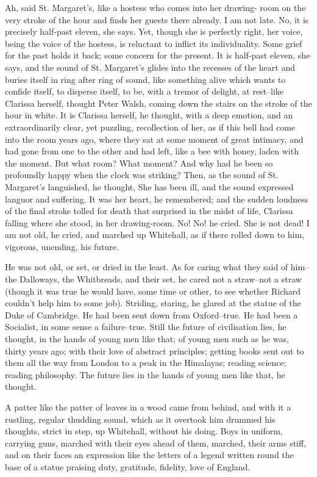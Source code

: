 \documentclass[lang=cn,10pt]{elegantbook}
\begin{document}
Ah, said St. Margaret's, like a hostess who comes into her drawing-
room on the very stroke of the hour and finds her guests there
already.  I am not late.  No, it is precisely half-past eleven, she
says.  Yet, though she is perfectly right, her voice, being the
voice of the hostess, is reluctant to inflict its individuality.
Some grief for the past holds it back; some concern for the
present.  It is half-past eleven, she says, and the sound of St.
Margaret's glides into the recesses of the heart and buries itself
in ring after ring of sound, like something alive which wants to
confide itself, to disperse itself, to be, with a tremor of
delight, at rest--like Clarissa herself, thought Peter Walsh,
coming down the stairs on the stroke of the hour in white.  It is
Clarissa herself, he thought, with a deep emotion, and an
extraordinarily clear, yet puzzling, recollection of her, as if
this bell had come into the room years ago, where they sat at some
moment of great intimacy, and had gone from one to the other and
had left, like a bee with honey, laden with the moment.  But what
room?  What moment?  And why had he been so profoundly happy when
the clock was striking?  Then, as the sound of St. Margaret's
languished, he thought, She has been ill, and the sound expressed
languor and suffering.  It was her heart, he remembered; and the
sudden loudness of the final stroke tolled for death that surprised
in the midst of life, Clarissa falling where she stood, in her
drawing-room.  No!  No! he cried.  She is not dead!  I am not old,
he cried, and marched up Whitehall, as if there rolled down to him,
vigorous, unending, his future.

He was not old, or set, or dried in the least.  As for caring what
they said of him--the Dalloways, the Whitbreads, and their set, he
cared not a straw--not a straw (though it was true he would have,
some time or other, to see whether Richard couldn't help him to
some job).  Striding, staring, he glared at the statue of the Duke
of Cambridge.  He had been sent down from Oxford--true.  He had
been a Socialist, in some sense a failure--true.  Still the future
of civilisation lies, he thought, in the hands of young men like
that; of young men such as he was, thirty years ago; with their
love of abstract principles; getting books sent out to them all the
way from London to a peak in the Himalayas; reading science;
reading philosophy.  The future lies in the hands of young men like
that, he thought.

A patter like the patter of leaves in a wood came from behind, and
with it a rustling, regular thudding sound, which as it overtook
him drummed his thoughts, strict in step, up Whitehall, without his
doing.  Boys in uniform, carrying guns, marched with their eyes
ahead of them, marched, their arms stiff, and on their faces an
expression like the letters of a legend written round the base of a
statue praising duty, gratitude, fidelity, love of England.
\end{document}
